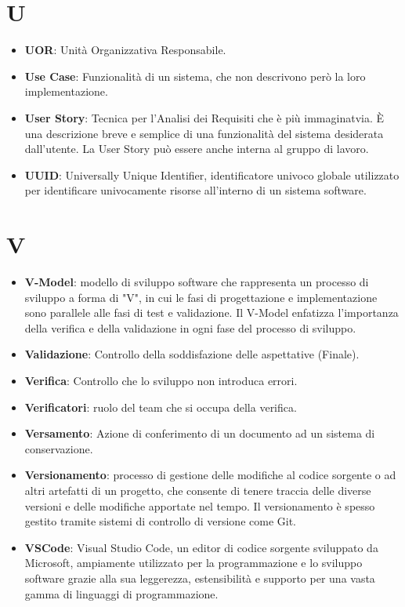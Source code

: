 \documentclass[a4paper,12pt]{article}
\begin{document}
\section{U}
\begin{itemize}
    \item \textbf{UOR}: Unità Organizzativa Responsabile.
    \item \textbf{Use Case}: Funzionalità di un sistema, che non descrivono però la loro implementazione.
    \item \textbf{User Story}: Tecnica per l'Analisi dei Requisiti che è più immaginatvia. È una descrizione breve e semplice di una funzionalità del sistema desiderata dall'utente. La User Story può essere anche interna al gruppo di lavoro.
    \item \textbf{UUID}: Universally Unique Identifier, identificatore univoco globale utilizzato per identificare univocamente risorse all'interno di un sistema software.
\end{itemize}
\section{V}
\begin{itemize}
    \item \textbf{V-Model}: modello di sviluppo software che rappresenta un processo di sviluppo a forma di "V", in cui le fasi di progettazione e implementazione sono parallele alle fasi di test e validazione. Il V-Model enfatizza l'importanza della verifica e della validazione in ogni fase del processo di sviluppo.
\end{itemize}
\begin{itemize}
    \item \textbf{Validazione}: Controllo della soddisfazione delle aspettative (Finale).
    \item \textbf{Verifica}: Controllo che lo sviluppo non introduca errori.
    \item \textbf{Verificatori}: ruolo del team che si occupa della verifica.
    \item \textbf{Versamento}: Azione di conferimento di un documento ad un sistema di conservazione.
    \item \textbf{Versionamento}: processo di gestione delle modifiche al codice sorgente o ad altri artefatti di un progetto, che consente di tenere traccia delle diverse versioni e delle modifiche apportate nel tempo. Il versionamento è spesso gestito tramite sistemi di controllo di versione come Git.
    \item \textbf{VSCode}: Visual Studio Code, un editor di codice sorgente sviluppato da Microsoft, ampiamente utilizzato per la programmazione e lo sviluppo software grazie alla sua leggerezza, estensibilità e supporto per una vasta gamma di linguaggi di programmazione.
\end{itemize}
\end{document}

